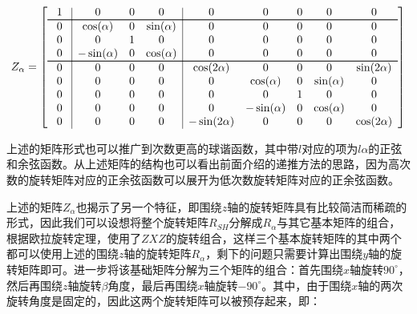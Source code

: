 \begin{equation}\label{e:pl-sh-rotation-z}
	Z_{\alpha}=\left[
	\centering
	\begin{array}{c|ccc|ccccc}
		\text{ 1 } & 0 & 0 & 0 & 0 & 0 & 0 & 0 & 0  \\
		\hline
		0 & \cos(\alpha) & 0 & \sin(\alpha) & 0 & 0 & 0 & 0 & 0  \\
		0 & 0 & 1 & 0 & 0 & 0 & 0 & 0 & 0 \\
		0 & -\sin(\alpha) & 0 & \cos(\alpha) & 0 & 0 & 0 & 0 & 0  \\
		\hline
		0 & 0 & 0 & 0 & \cos(2\alpha) & 0 & 0 & 0 & \sin(2\alpha)  \\
		0 & 0 & 0 & 0 & 0 & \cos(\alpha) & 0 & \sin(\alpha) & 0  \\
		0 & 0 & 0 & 0 & 0 & 0 & 1 & 0 & 0  \\
		0 & 0 & 0 & 0 & 0 & -\sin(\alpha) & 0 & \cos(\alpha) & 0  \\
		0 & 0 & 0 & 0 & -\sin(2\alpha) & 0 & 0 & 0 & \cos(2\alpha)  \\
	\end{array}
	\right]
\end{equation}

上述的矩阵形式也可以推广到次数更高的球谐函数，其中带$l$对应的项为$l\alpha$的正弦和余弦函数。从上述矩阵的结构也可以看出前面介绍的递推方法的思路，因为高次数的旋转矩阵对应的正余弦函数可以展开为低次数旋转矩阵对应的正余弦函数。

上述的矩阵$Z_{\alpha}$也揭示了另一个特征，即围绕$z$轴的旋转矩阵具有比较简洁而稀疏的形式，因此我们可以设想将整个旋转矩阵$R_{SH}$分解成$R_{\alpha}$与其它基本矩阵的组合，根据欧拉旋转定理，\cite{a:FastArbitraryBRDFShadingforLowFrequencyLightingUsingSphericalHarmonics}使用了$ZXZ$的旋转组合，这样三个基本旋转矩阵的其中两个都可以使用上述的围绕$z$轴的旋转矩阵$R_{\alpha}$，剩下的问题只需要计算出围绕$y$轴的旋转矩阵即可。\cite{a:FastArbitraryBRDFShadingforLowFrequencyLightingUsingSphericalHarmonics}进一步将该基础矩阵分解为三个矩阵的组合：首先围绕$x$轴旋转$90^{\circ}$，然后再围绕$z$轴旋转$\beta$角度，最后再围绕$x$轴旋转$-90^{\circ}$。其中，由于围绕$x$轴的两次旋转角度是固定的，因此这两个旋转矩阵可以被预存起来，即：

